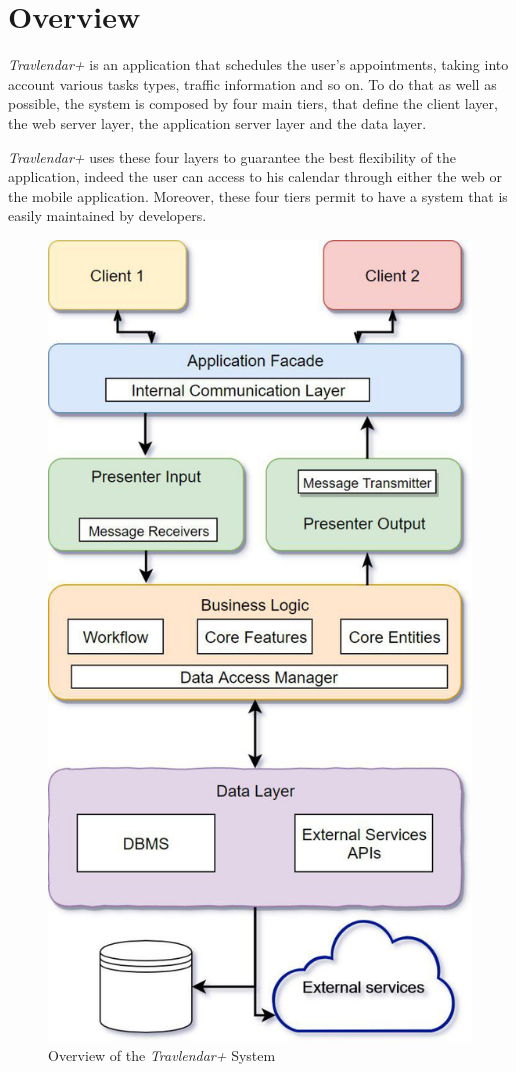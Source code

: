 \section{Overview}
\emph{Travlendar+} is an application that schedules the user's appointments, taking into account various tasks types, traffic information and so on. To do that as well as possible, the system is composed by four main tiers, that define the client layer, the web server layer, the application server layer and the data layer.

\emph{Travlendar+} uses these four layers to guarantee the best flexibility of the application, indeed the user can access to his calendar through either the web or the mobile application. Moreover, these four tiers permit to have a system that is easily maintained by developers.

\begin{figure}[H]
    \centering
    \includegraphics[scale=0.7]{Pictures/OverviewPictures/overviewDiagram.jpg}
    \caption{Overview of the \emph{Travlendar+} System}
\end{figure}

